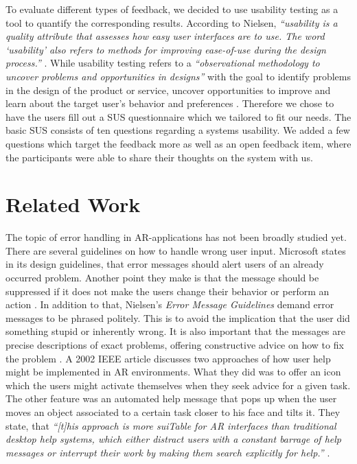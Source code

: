 \documentclass[11pt, a4paper]{article}
\begin{document}
		To evaluate different types of feedback, we decided to use usability testing as a tool to quantify the corresponding results. According to Nielsen, \textit{``usability is a quality attribute that assesses how easy user interfaces are to use. The word `usability' also refers to methods for improving ease-of-use during the design process.''} \cite{Nielsen2012}. While usability testing refers to a \textit{``observational methodology to uncover problems and opportunities in designs''} with the goal to identify problems in the design of the product or service, uncover opportunities to improve and learn about the target user's behavior and preferences \cite{Moran2019}. Therefore we chose to have the users fill out a \ac{SUS} questionnaire which we tailored to fit our needs. The basic \ac{SUS} consists of ten questions regarding a systems usability. We added a few questions which target the feedback more as well as an open feedback item, where the participants were able to share their thoughts on the system with us. 

	\section*{Related Work}\label{sec:relatedwork}
		The topic of error handling in \ac{AR}-applications has not been broadly studied yet. There are several guidelines on how to handle wrong user input. Microsoft states in its design guidelines, that error messages should alert users of an already occurred problem. Another point they make is that the message should be suppressed if it does not make the users change their behavior or perform an action \cite{Microsoft2018}. In addition to that, Nielsen's \textit{Error Message Guidelines} demand error messages to be phrased politely. This is to avoid the implication that the user did something stupid or inherently wrong. It is also important that the messages are precise descriptions of exact problems, offering constructive advice on how to fix the problem \cite{Nielsen2001}. A 2002 IEEE article discusses two approaches of how user help might be implemented in \ac{AR} environments. What they did was to offer an icon which the users might activate themselves when they seek advice for a given task. The other feature was an automated help message that pops up when the user moves an object associated to a certain task closer to his face and tilts it. They state, that \textit{``\textnormal{[t]}his approach is more suiTable for AR interfaces than traditional desktop help systems, which either distract users with a constant barrage of help messages or interrupt their work by making them search explicitly for help.''} \cite{Poupyrev2002}.
\end{document}
